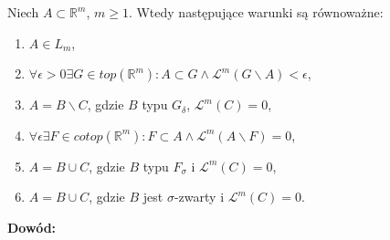 \begin{tw}
	Niech $A \subset \mathbb{R}^m$, $m \geq 1$. Wtedy następujące warunki są równoważne:
	\begin{enumerate}
		\item $A \in L_m$,
		\item $\forall \epsilon > 0 \exists G \in top(\mathbb{R}^m): A \subset G \wedge \mathcal{L}^m(G \backslash A) < \epsilon$,
		\item $A = B \backslash C$, gdzie $B$ typu $G_{\delta}$, $\mathcal{L}^m(C) = 0$,
		\item $\forall \epsilon \exists F \in cotop(\mathbb{R}^m): F \subset A \wedge \mathcal{L}^m(A \backslash F) = 0$,
		\item $A = B \cup C$, gdzie $B$ typu $F_{\sigma}$ i  $\mathcal{L}^m(C) = 0$,
		\item $A = B \cup C$, gdzie $B$ jest $\sigma$-zwarty i $\mathcal{L}^m(C) = 0$.
	\end{enumerate}

	\textbf{Dowód:} \citep[AM4, 3.42]{Tworzewski}
\end{tw}